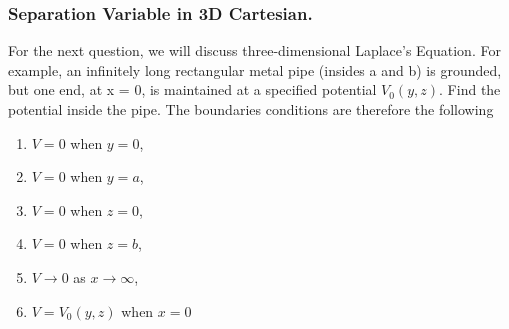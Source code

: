 \documentclass[../../../main.tex]{subfiles}
\begin{document}
\subsubsection{Separation Variable in 3D Cartesian.} For the next question, we will discuss three-dimensional Laplace's Equation. For example, an infinitely long rectangular metal pipe (insides a and b) is grounded, but one end, at x = 0, is maintained at a specified potential $V_0(y, z)$. Find the potential inside the pipe. The boundaries conditions are therefore the following
\begin{enumerate}
    \item $V = 0$ when $y = 0$,
    \item $V = 0$ when $y = a$,
    \item $V = 0$ when $z = 0$,
    \item $V = 0$ when $z = b$,
    \item $V \rightarrow 0$ as $x \rightarrow \infty$,
    \item$ V = V_0(y, z)$ when $x = 0$
\end{enumerate}
\begin{figure}[ht]
    \centering
\end{figure}
\end{document}

